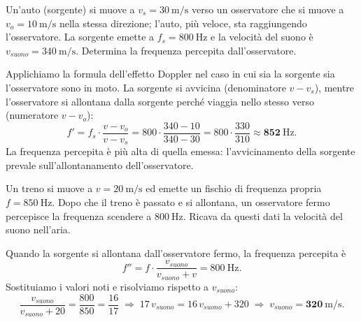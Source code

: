 \begin{question}[ID=3.4, subtitle={Sorgente e osservatore in moto nella stessa direzione}, tags={doppler, osservatore e sorgente mobili}, difficulty=difficile]
Un'auto (sorgente) si muove a $v_s = 30\ \mathrm{m/s}$ verso un osservatore che si muove a $v_o = 10\ \mathrm{m/s}$ nella stessa direzione; l'auto, più veloce, sta raggiungendo l'osservatore. La sorgente emette a $f_s = 800\ \mathrm{Hz}$ e la velocità del suono è $v_{suono} = 340\ \mathrm{m/s}$. Determina la frequenza percepita dall'osservatore.
\begin{solution}
Applichiamo la formula dell'effetto Doppler nel caso in cui sia la sorgente sia l'osservatore sono in moto. La sorgente si avvicina (denominatore $v - v_s$), mentre l'osservatore si allontana dalla sorgente perché viaggia nello stesso verso (numeratore $v - v_o$):
\[
f' = f_s\cdot\frac{v - v_o}{v - v_s} = 800\cdot\frac{340-10}{340-30} = 800\cdot\frac{330}{310} \approx \mathbf{852\ \mathrm{Hz}}.
\]
La frequenza percepita è più alta di quella emessa: l'avvicinamento della sorgente prevale sull'allontanamento dell'osservatore.
\end{solution}
\end{question}

\begin{question}[ID=3.5, subtitle={Treno in arrivo: ricavare la velocità del suono dai battimenti}, tags={doppler, avvicinamento e allontanamento}, difficulty=media]
Un treno si muove a $v = 20\ \mathrm{m/s}$ ed emette un fischio di frequenza propria $f = 850\ \mathrm{Hz}$. Dopo che il treno è passato e si allontana, un osservatore fermo percepisce la frequenza scendere a $800\ \mathrm{Hz}$. Ricava da questi dati la velocità del suono nell'aria.
\begin{solution}
Quando la sorgente si allontana dall'osservatore fermo, la frequenza percepita è
\[
f'' = f\cdot\frac{v_{suono}}{v_{suono}+v} = 800\ \mathrm{Hz}.
\]
Sostituiamo i valori noti e risolviamo rispetto a $v_{suono}$:
\[
\frac{v_{suono}}{v_{suono}+20} = \frac{800}{850} = \frac{16}{17}
\;\Rightarrow\;
17\,v_{suono} = 16\,v_{suono} + 320
\;\Rightarrow\;
v_{suono} = \mathbf{320\ \mathrm{m/s}}.
\]
\end{solution}
\end{question}

